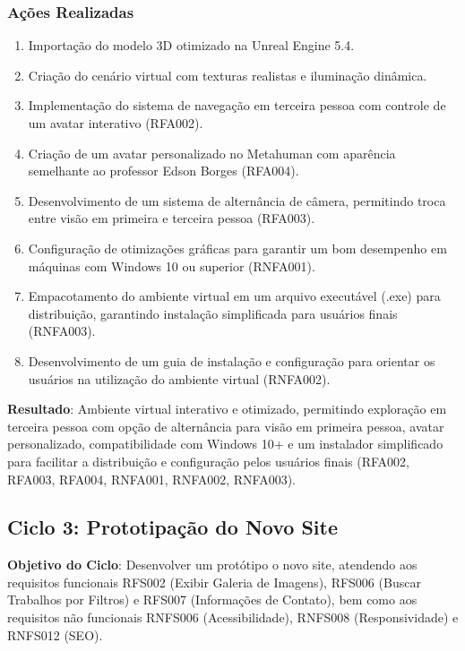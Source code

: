 \subsubsection*{Ações Realizadas}
\begin{enumerate}
    \item Importação do modelo 3D otimizado na Unreal Engine 5.4.
    \item Criação do cenário virtual com texturas realistas e iluminação dinâmica.
    \item Implementação do sistema de navegação em terceira pessoa com controle de um avatar interativo (RFA002).
    \item Criação de um avatar personalizado no Metahuman com aparência semelhante ao professor Edson Borges (RFA004).
    \item Desenvolvimento de um sistema de alternância de câmera, permitindo troca entre visão em primeira e terceira pessoa (RFA003).
    \item Configuração de otimizações gráficas para garantir um bom desempenho em máquinas com Windows 10 ou superior (RNFA001).
    \item Empacotamento do ambiente virtual em um arquivo executável (.exe) para distribuição, garantindo instalação simplificada para usuários finais (RNFA003).
    \item Desenvolvimento de um guia de instalação e configuração para orientar os usuários na utilização do ambiente virtual (RNFA002).
\end{enumerate}

\textbf{Resultado}: Ambiente virtual interativo e otimizado, permitindo exploração em terceira pessoa com opção de alternância para visão em primeira pessoa, avatar personalizado, compatibilidade com Windows 10+ e um instalador simplificado para facilitar a distribuição e configuração pelos usuários finais (RFA002, RFA003, RFA004, RNFA001, RNFA002, RNFA003).

\subsection*{Ciclo 3: Prototipação do Novo Site} \label{subsec:ciclo3}

\textbf{Objetivo do Ciclo}: Desenvolver um protótipo o novo site, atendendo aos requisitos funcionais RFS002 (Exibir Galeria de Imagens), RFS006 (Buscar Trabalhos por Filtros) e RFS007 (Informações de Contato), bem como aos requisitos não funcionais RNFS006 (Acessibilidade), RNFS008 (Responsividade) e RNFS012 (SEO).

